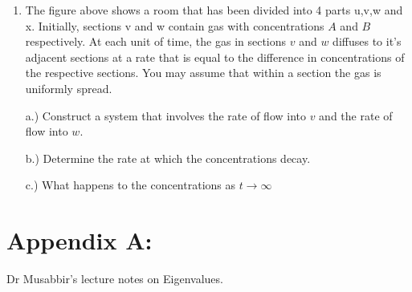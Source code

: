 \documentclass[answers, a4paper, 11pt]{exam}
\begin{document}
\begin{enumerate}
\begin{solution}


\end{solution}

\item

The figure above shows a room that has been divided into 4 parts u,v,w and x. Initially, sections v and w contain gas with concentrations $A$ and $B$ respectively. At each unit of time, the gas in sections $v$ and $w$ diffuses to it's adjacent sections at a rate that is equal to the difference in concentrations of the respective sections. You may assume that within a section the gas is uniformly spread.

a.) Construct a system that involves the rate of flow into $v$ and the rate of flow into $w$.

\begin{solution}


\end{solution}

b.) Determine the rate at which the concentrations decay.

\begin{solution}


\end{solution}

c.) What happens to the concentrations as $t \rightarrow \infty$

\begin{solution}


\end{solution}

\end{enumerate}

\newpage

\section*{Appendix A:}

\newpage

\begin{thebibliography}{}
 Dr Musabbir's lecture notes on Eigenvalues. 
\end{thebibliography}
\end{document}
